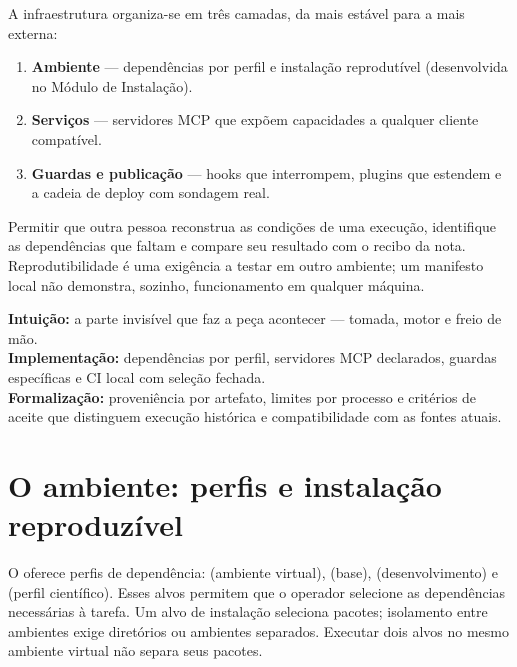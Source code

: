 \begin{conceito}
A infraestrutura organiza-se em três camadas, da mais estável para a mais externa:
\begin{enumerate}[leftmargin=1.4em,itemsep=1pt]
  \item \textbf{Ambiente} --- dependências por perfil e instalação reprodutível
        (desenvolvida no Módulo de Instalação).
  \item \textbf{Serviços} --- servidores MCP que expõem capacidades a qualquer
        cliente compatível.
  \item \textbf{Guardas e publicação} --- hooks que interrompem, plugins que
        estendem e a cadeia de deploy com sondagem real.
\end{enumerate}
\end{conceito}

\begin{funcao}
Permitir que outra pessoa reconstrua as condições de uma execução, identifique
as dependências que faltam e compare seu resultado com o recibo da nota.
Reprodutibilidade é uma exigência a testar em outro ambiente; um manifesto
local não demonstra, sozinho, funcionamento em qualquer máquina.
\end{funcao}

\begin{niveis}
\textbf{Intuição:} a parte invisível que faz a peça acontecer --- tomada, motor e
freio de mão.\\
\textbf{Implementação:} dependências por perfil, \CoreMCPCount{} servidores MCP
declarados, guardas específicas e CI local com seleção fechada.\\
\textbf{Formalização:} proveniência por artefato, limites por processo e critérios
de aceite que distinguem execução histórica e compatibilidade com as fontes atuais.
\end{niveis}

\section{O ambiente: perfis e instalação reproduzível}

\begin{descricao}
O  oferece perfis de dependência:  (ambiente
virtual),  (base),  (desenvolvimento) e
 (perfil científico). Esses alvos permitem que o
operador selecione as dependências necessárias à tarefa. Um alvo de instalação
seleciona pacotes; isolamento entre ambientes exige diretórios ou ambientes
separados. Executar dois alvos no mesmo ambiente virtual não separa seus pacotes.
\end{descricao}


